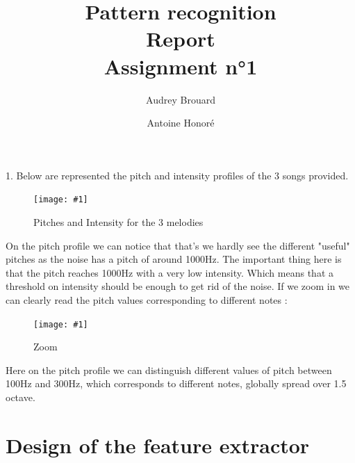 \documentclass[a4paper]{report}
\title{Pattern recognition\\Report\\Assignment n°1}
\author{Audrey Brouard \and Antoine Honoré}
\newcommand{\img}[3]{\begin{figure}[!h] \centering \texttt{[image: \#1]}\captionsetup{justification=centering} \caption{#3} \label{#1} \end{figure}}
\begin{document}

\section{}


1. Below are represented the pitch and intensity profiles of the 3 songs provided. 
\img{Pitch_intens}{.8}{Pitches and Intensity for the 3 melodies}

On the pitch profile we can notice that that's we hardly see the different "useful" pitches as the noise has a pitch of around 1000Hz. The important thing here is that the pitch reaches 1000Hz with a very low intensity. Which means that a threshold on intensity should be enough to get rid of the noise. If we zoom in we can clearly read the pitch values corresponding to different notes :

\img{Pitch_intens_zoom}{.8}{Zoom}

Here on the pitch profile we can distinguish different values of pitch between 100Hz and 300Hz, which corresponds to different notes, globally spread over 1.5 octave.

\section{Design of the feature extractor}
\end{document}
